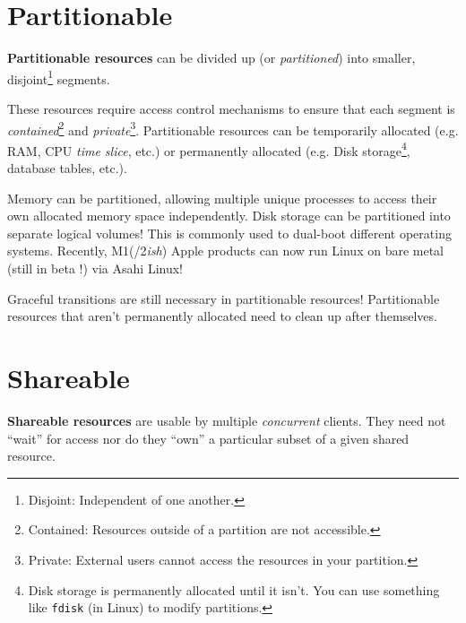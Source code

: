 \documentclass{report}
\begin{document}
\section{Partitionable}
\begin{tcolorbox}[title=Definition: Partitionable Resource]
  \textbf{Partitionable resources} can be divided up (or \textit{partitioned}) into smaller,
  disjoint\footnote{Disjoint: Independent of one another.} segments.  
\end{tcolorbox}

These resources require access control mechanisms to ensure that each segment is
\textit{contained}\footnote{Contained: Resources outside of a partition are not accessible.} and
\textit{private}\footnote{Private: External users cannot access the resources in your
  partition.}. Partitionable resources can be temporarily allocated (e.g. RAM, CPU \textit{time
  slice}, etc.) or permanently allocated (e.g. Disk
storage\footnote{Disk storage is permanently allocated until it isn't. You can use something like
  \texttt{fdisk} (in Linux) to modify partitions.}, database tables, etc.).

\begin{tcolorbox}[colback=blue!5!white,colframe=black!75!blue,title=Example: Memory Mania and Disk Division]
  Memory can be partitioned, allowing multiple unique processes to access their own allocated memory
  space independently.
  \tcblower
  Disk storage can be partitioned into separate logical volumes! This is commonly used to dual-boot
  different operating systems. Recently, M1(/2\textit{ish}) Apple products can now run Linux on
  bare metal (still in beta !) via Asahi Linux!
\end{tcolorbox}

Graceful transitions are still necessary in partitionable resources! Partitionable resources that
aren't permanently allocated need to clean up after themselves.





\section{Shareable}

\begin{tcolorbox}[title=Definition: Shareable Resource]
  \textbf{Shareable resources} are usable by multiple \textit{concurrent} clients. They need not
  ``wait'' for access nor do they ``own'' a particular subset of a given shared resource. 
\end{tcolorbox}
\end{document}
